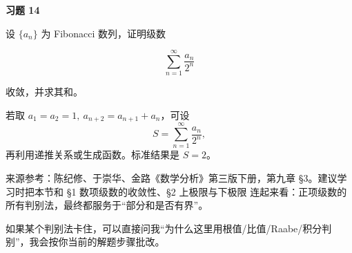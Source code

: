 \begin{exercisebox}
\textbf{习题 14 }

设 \(\{a_n\}\) 为 Fibonacci 数列，证明级数

\[
      \sum_{n=1}^{\infty}\frac{a_n}{2^n}
      \]

收敛，并求其和。

\begin{hintbox}
若取 \(a_1=a_2=1,\ a_{n+2}=a_{n+1}+a_n\)，可设 \[
        S=\sum_{n=1}^{\infty}\frac{a_n}{2^n},
        \] 再利用递推关系或生成函数。标准结果是 \(S=2\)。
\end{hintbox}
\end{exercisebox}

来源参考：陈纪修、于崇华、金路《数学分析》第三版下册，第九章 §3。建议学习时把本节和 §1 数项级数的收敛性、§2 上极限与下极限 连起来看：正项级数的所有判别法，最终都服务于“部分和是否有界”。

如果某个判别法卡住，可以直接问我“为什么这里用根值/比值/Raabe/积分判别”，我会按你当前的解题步骤批改。
